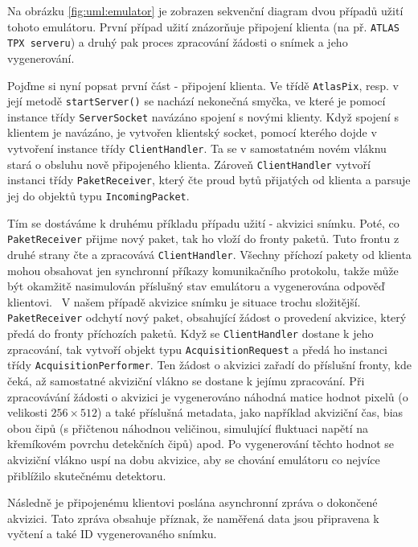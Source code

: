 Na obrázku \ref{fig:uml:emulator} je zobrazen sekvenční diagram dvou případů užití tohoto emulátoru. První případ užití znázorňuje připojení klienta (na př. \texttt{ATLAS TPX serveru}) a druhý pak proces zpracování žádosti o snímek a jeho vygenerování.

Pojďme si nyní popsat první část - připojení klienta. Ve třídě \texttt{AtlasPix}, resp. v její metodě \texttt{startServer()} se nachází nekonečná smyčka, ve které je pomocí instance třídy \texttt{ServerSocket} navázáno spojení s novými klienty. Když spojení s klientem je navázáno, je vytvořen klientský socket, pomocí kterého dojde v vytvoření instance třídy \texttt{ClientHandler}. Ta se v samostatném novém vláknu stará o obsluhu nově připojeného klienta. Zároveň \texttt{ClientHandler} vytvoří instanci třídy \texttt{PaketReceiver}, který čte proud bytů přijatých od klienta a parsuje jej do objektů typu \texttt{IncomingPacket}.

Tím se dostáváme k druhému příkladu případu užití - akvizici snímku. Poté, co \\\texttt{PaketReceiver} přijme nový paket, tak ho vloží do fronty paketů. Tuto frontu z druhé strany čte a zpracovává \texttt{ClientHandler}. Všechny příchozí pakety od klienta mohou obsahovat jen synchronní příkazy komunikačního protokolu, takže může být okamžitě nasimulován příslušný stav emulátoru a vygenerována odpověď klientovi. 
\
V našem případě akvizice snímku je situace trochu složitější. \texttt{PaketReceiver} odchytí nový paket, obsahující žádost o provedení akvizice, který předá do fronty příchozích paketů. Když se \texttt{ClientHandler} dostane k jeho zpracování, tak vytvoří objekt typu \texttt{AcquisitionRequest} a předá ho instanci třídy \texttt{AcquisitionPerformer}. Ten žádost o akvizici zařadí do příslušní fronty, kde čeká, až samostatné akviziční vlákno se dostane k jejímu zpracování. Při zpracovávání žádosti o akvizici je vygenerováno náhodná matice hodnot pixelů (o velikosti $256\times512$) a také příslušná metadata, jako například akviziční čas, bias obou čipů (s přičtenou náhodnou veličinou, simulující fluktuaci napětí na křemíkovém povrchu detekčních čipů) apod. Po vygenerování těchto hodnot se akviziční vlákno uspí na dobu akvizice, aby se chování emulátoru co nejvíce přiblížilo skutečnému detektoru.

Následně je připojenému klientovi poslána asynchronní zpráva o dokončené akvizici. Tato zpráva obsahuje příznak, že naměřená data jsou připravena k vyčtení a také ID vygenerovaného snímku. 

